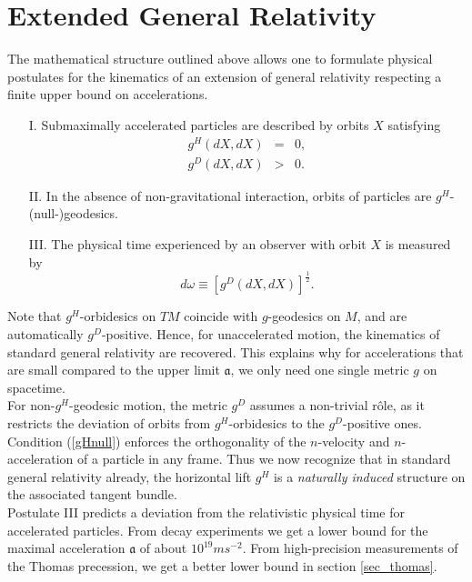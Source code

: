 \documentclass[11pt,a4paper,twoside]{article}
\begin{document}
\section{Extended General Relativity}
The mathematical structure outlined above allows one to formulate physical
postulates for the kinematics of an extension of general relativity
respecting a finite upper bound on accelerations.
\begin{enumerate}
\item[I.] Submaximally accelerated particles are described by orbits
$X$ satisfying
  \begin{eqnarray}
    g^H(dX,dX) &=& 0, \label{gHnull}\\
    g^D(dX,dX) &>& 0  \label{gDpos}.
  \end{eqnarray}
\item[II.] In the absence of non-gravitational interaction, orbits of
particles are $g^H$-(null-)geodesics.
\item[III.] The physical time experienced by an observer with orbit $X$ is
measured by
\begin{equation}
  d\omega \equiv \left[g^D(dX,dX)\right]^{\frac{1}{2}}.
\end{equation}
\end{enumerate}
Note that $g^H$-orbidesics on $TM$ coincide with $g$-geodesics on
$M$, and are automatically $g^D$-positive. Hence, for unaccelerated
motion, the kinematics of standard general relativity are
recovered. This explains why for accelerations that are small compared
to the upper limit $\mathfrak{a}$, we only need one single metric $g$
on spacetime.\\
For non-$g^H$-geodesic motion, the metric $g^D$ assumes a non-trivial
r\^ole, as it restricts the deviation of orbits from $g^H$-orbidesics
to the $g^D$-positive ones.\\
Condition (\ref{gHnull}) enforces the orthogonality of the
$n$-velocity and $n$-acceleration of a particle in any frame. Thus
we now recognize that in standard general relativity already, the
horizontal lift $g^H$ is a \textsl{naturally induced} structure on the
associated tangent bundle.\\
Postulate III predicts a deviation from the relativistic physical
time for accelerated particles. From decay experiments \cite{Farley}
we get a lower bound for the maximal acceleration $\mathfrak{a}$ of
about $10^{19} m s^{-2}$. From high-precision measurements of the
Thomas precession, we get a better lower bound in section \ref{sec_thomas}.
\end{document}
